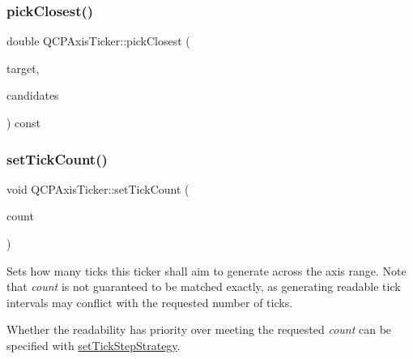 \mbox{\label{class_q_c_p_axis_ticker_a4ea0a7c4ca1c610f92b9bd5944ab4260}} 
\subsubsection{\texorpdfstring{pick\+Closest()}{pickClosest()}}
{\footnotesize\ttfamily double Q\+C\+P\+Axis\+Ticker\+::pick\+Closest (\begin{DoxyParamCaption}\item[{double}]{target,  }\item[{const Q\+Vector$<$ double $>$ \&}]{candidates }\end{DoxyParamCaption}) const\hspace{0.3cm}{\ttfamily [protected]}}

\mbox{\label{class_q_c_p_axis_ticker_a47752abba8293e6dc18491501ae34008}} 
\subsubsection{\texorpdfstring{set\+Tick\+Count()}{setTickCount()}}
{\footnotesize\ttfamily void Q\+C\+P\+Axis\+Ticker\+::set\+Tick\+Count (\begin{DoxyParamCaption}\item[{int}]{count }\end{DoxyParamCaption})}

Sets how many ticks this ticker shall aim to generate across the axis range. Note that {\itshape count} is not guaranteed to be matched exactly, as generating readable tick intervals may conflict with the requested number of ticks.

Whether the readability has priority over meeting the requested {\itshape count} can be specified with \hyperlink{class_q_c_p_axis_ticker_a73b1d847c1a12159af6bfda4ebebe7d5}{set\+Tick\+Step\+Strategy}. \mbox{\label{class_q_c_p_axis_ticker_ab509c7e500293bf66a8409f0d7c23943}} 
